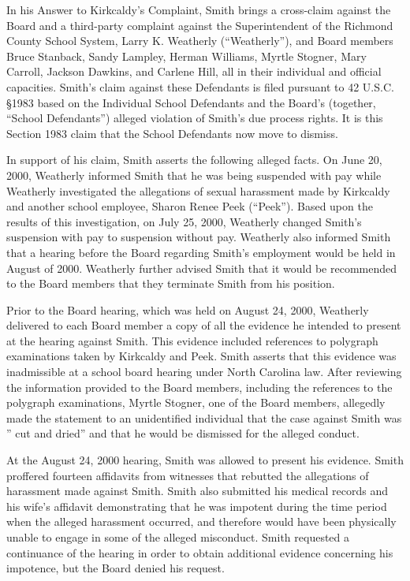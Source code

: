 \documentclass[11pt,letterpaper,twoside]{article}
\begin{document}
In his Answer to Kirkcaldy's Complaint, Smith brings a cross-claim
against the Board and a third-party complaint against the Superintendent
of the Richmond County School System, Larry K. Weatherly
(``Weatherly''), and Board members Bruce Stanback, Sandy Lampley, Herman
Williams, Myrtle Stogner, Mary Carroll, Jackson Dawkins, and Carlene
Hill, all in their individual and official capacities. Smith's claim
against these Defendants is filed pursuant to 42 U.S.C. §1983 based on
the Individual School Defendants and the Board's (together, ``School
Defendants'') alleged violation of Smith's due process rights. It is
this Section 1983 claim that the School Defendants now move to dismiss.

In support of his claim, Smith asserts the following alleged facts. On
June 20, 2000, Weatherly informed Smith that he was being suspended with
pay while Weatherly investigated the allegations of sexual harassment
made by Kirkcaldy and another school employee, Sharon Renee Peek
(``Peek''). Based upon the results of this investigation, on July 25,
2000, Weatherly changed Smith's suspension with pay to suspension
without pay. Weatherly also informed Smith that a hearing before the
Board regarding Smith's employment would be held in August of 2000.
Weatherly further advised Smith that it would be recommended to the
Board members that they terminate Smith from his position.

Prior to the Board hearing, which was held on August 24, 2000, Weatherly
delivered to each Board member a copy of all the evidence he intended to
present at the hearing against Smith. This evidence included references
to polygraph examinations taken by Kirkcaldy and Peek. Smith asserts
that this evidence was inadmissible at a school board hearing under
North Carolina law. After reviewing the information provided to the
Board members, including the references to the polygraph examinations,
Myrtle Stogner, one of the Board members, allegedly made the statement
to an unidentified individual that the case against Smith was '' cut and
dried'' and that he would be dismissed for the alleged conduct.

At the August 24, 2000 hearing, Smith was allowed to present his
evidence. Smith proffered fourteen affidavits from witnesses that
rebutted the allegations of harassment made against Smith. Smith also
submitted his medical records and his wife's affidavit demonstrating
that he was impotent during the time period when the alleged harassment
occurred, and therefore would have been physically unable to engage in
some of the alleged misconduct. Smith requested a continuance of the
hearing in order to obtain additional evidence concerning his impotence,
but the Board denied his request.
\end{document}
